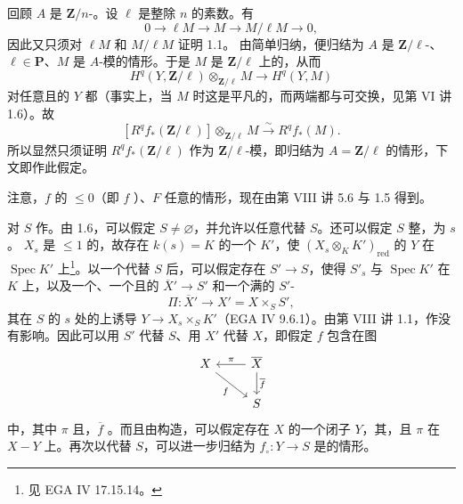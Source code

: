 回顾 $A$ 是 $\mathbf Z/n$-。设 $\ell$ 是整除 $n$ 的素数。有
\[
0\longrightarrow\ell M\longrightarrow M\longrightarrow M/\ell M\longrightarrow0,
\]
因此又只须对 $\ell M$ 和 $M/\ell M$ 证明 1.1。
由简单归纳，便归结为 $A$ 是 $\mathbf Z/\ell$-、$\ell\in\mathbf P$、$M$ 是 $A$-模的情形。于是 $M$ 是 $\mathbf Z/\ell$ 上的，从而
\[
H^q(Y,\mathbf Z/\ell)\otimes_{\mathbf Z/\ell}M\longrightarrow H^q(Y,M)
\]
对任意且的 $Y$ 都（事实上，当 $M$ 时这是平凡的，而两端都与可交换，见第 VI 讲 1.6）。故
\[
[R^qf_*(\mathbf Z/\ell)]\otimes_{\mathbf Z/\ell}M\xrightarrow{\sim}R^qf_*(M).
\]
所以显然只须证明 $R^qf_*(\mathbf Z/\ell)$ 作为 $\mathbf Z/\ell$-模，即归结为 $A=\mathbf Z/\ell$ 的情形，下文即作此假定。

注意，$f$ 的 $\leq0$（即 $f$ ）、$F$ 任意的情形，现在由第 VIII 讲 5.6 与 1.5 得到。

对 $S$ 作。由 1.6，可以假定 $S\ne\varnothing$，并允许以任意代替 $S$。还可以假定 $S$ 整，为 $s$。 $X_s$ 是 $\leq1$ 的，故存在 $k(s)=K$ 的一个 $K'$，使 $(X_s\otimes_KK')_{\mathrm{red}}$ 的 $Y$ 在 $\operatorname{Spec}K'$ 上\footnote{见 EGA IV 17.15.14。}。以一个代替 $S$ 后，可以假定存在 $S'\to S$，使得 $S'_s$ 与 $\operatorname{Spec}K'$ 在 $K$ 上，以及一个、一个且的 $\overline X'\to S'$ 和一个满的 $S'$-
\[
\Pi:\overline X'\longrightarrow X'=X\times_SS',
\]
其在 $S$ 的 $s$ 处的上诱导 $Y\to X_s\times_SK'$（EGA IV 9.6.1）。由第 VIII 讲 1.1，作没有影响。因此可以用 $S'$ 代替 $S$、用 $X'$ 代替 $X$，即假定 $f$ 包含在图
\[
\begin{tikzcd}
X\arrow[dr,"f"']&\overline X\arrow[l,"\pi"']\arrow[d,"\overline f"]\\
&S
\end{tikzcd}
\]
中，其中 $\pi$ 且，$\overline f$ 。而且由构造，可以假定存在 $X$ 的一个闭子 $Y$，其，且 $\pi$ 在 $X-Y$ 上。再次以代替 $S$，可以进一步归结为 $f_\circ:Y\to S$ 是的情形。

